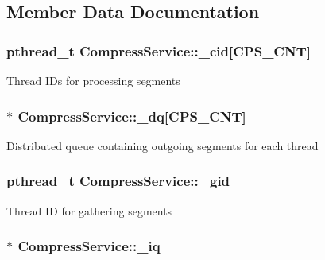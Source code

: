 \subsection{\-Member \-Data \-Documentation}
\hypertarget{structCompressService_ac1792be4297e02ba1aed8a71f29e2b5a}{
\subsubsection[{\-\_\-cid}]{\setlength{\rightskip}{0pt plus 5cm}pthread\-\_\-t {\bf \-Compress\-Service\-::\-\_\-cid}\mbox{[}{\bf \-C\-P\-S\-\_\-\-C\-N\-T}\mbox{]}}}\label{structCompressService_ac1792be4297e02ba1aed8a71f29e2b5a}
\-Thread \-I\-Ds for processing segments \hypertarget{structCompressService_a8f225d532b28a32fb4de849ba6a54def}{
\subsubsection[{\-\_\-dq}]{$\ast$ {\bf \-Compress\-Service\-::\-\_\-dq}\mbox{[}{\bf \-C\-P\-S\-\_\-\-C\-N\-T}\mbox{]}}}\label{structCompressService_a8f225d532b28a32fb4de849ba6a54def}
\-Distributed queue containing outgoing segments for each thread \hypertarget{structCompressService_a71c80458913f442d0572d9dc6ecc01a2}{
\subsubsection[{\-\_\-gid}]{\setlength{\rightskip}{0pt plus 5cm}pthread\-\_\-t {\bf \-Compress\-Service\-::\-\_\-gid}}}\label{structCompressService_a71c80458913f442d0572d9dc6ecc01a2}
\-Thread \-I\-D for gathering segments \hypertarget{structCompressService_ada5072ad1b06d04d69ce7e379250c5c5}{
\subsubsection[{\-\_\-iq}]{$\ast$ {\bf \-Compress\-Service\-::\-\_\-iq}}}\label{structCompressService_ada5072ad1b06d04d69ce7e379250c5c5}
